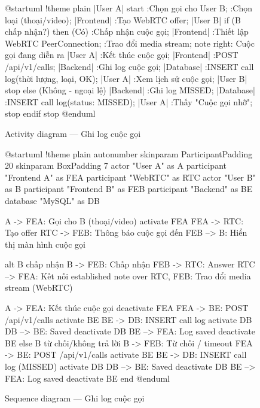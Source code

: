 \documentclass[12pt,a4paper]{report}
\begin{document}
\begin{figure}[H]
    \centering
    \begin{plantuml}
        @startuml
        !theme plain
        |User A|
        start
        :Chọn gọi cho User B;
        :Chọn loại (thoại/video);
        |Frontend|
        :Tạo WebRTC offer;
        |User B|
        if (B chấp nhận?) then (Có)
          :Chấp nhận cuộc gọi;
          |Frontend|
          :Thiết lập WebRTC PeerConnection;
          :Trao đổi media stream;
          note right: Cuộc gọi đang diễn ra
          |User A|
          :Kết thúc cuộc gọi;
          |Frontend|
          :POST /api/v1/calls;
          |Backend|
          :Ghi log cuộc gọi;
          |Database|
          :INSERT call log\n(thời lượng, loại, OK);
          |User A|
          :Xem lịch sử cuộc gọi;
          |User B|
          stop
        else (Không - ngoại lệ)
          |Backend|
          :Ghi log MISSED;
          |Database|
          :INSERT call log\n(status: MISSED);
          |User A|
          :Thấy "Cuộc gọi nhỡ";
          stop
        endif
        stop
        @enduml
    \end{plantuml}
    \caption{Activity diagram --- Ghi log cuộc gọi}
\end{figure}

\begin{figure}[H]
    \centering
    \begin{plantuml}
        @startuml
        !theme plain
        autonumber
        skinparam ParticipantPadding 20
        skinparam BoxPadding 7
        actor "User A" as A
        participant "Frontend A" as FEA
        participant "WebRTC" as RTC
        actor "User B" as B
        participant "Frontend B" as FEB
        participant "Backend" as BE
        database "MySQL" as DB

        A -> FEA: Gọi cho B (thoại/video)
        activate FEA
        FEA -> RTC: Tạo offer
        RTC -> FEB: Thông báo cuộc gọi đến
        FEB --> B: Hiển thị màn hình cuộc gọi

        alt B chấp nhận
          B -> FEB: Chấp nhận
          FEB -> RTC: Answer
          RTC --> FEA: Kết nối established
          note over RTC, FEB: Trao đổi media stream (WebRTC)

          A -> FEA: Kết thúc cuộc gọi
          deactivate FEA
          FEA -> BE: POST /api/v1/calls
          activate BE
          BE -> DB: INSERT call log
          activate DB
          DB --> BE: Saved
          deactivate DB
          BE --> FEA: Log saved
          deactivate BE
        else B từ chối/không trả lời
          B -> FEB: Từ chối / timeout
          FEA -> BE: POST /api/v1/calls
          activate BE
          BE -> DB: INSERT call log (MISSED)
          activate DB
          DB --> BE: Saved
          deactivate DB
          BE --> FEA: Log saved
          deactivate BE
        end
        @enduml
    \end{plantuml}
    \caption{Sequence diagram --- Ghi log cuộc gọi}
\end{figure}
\end{document}
